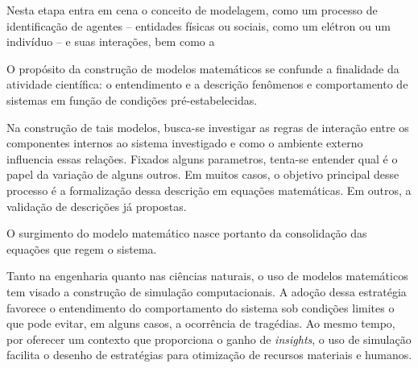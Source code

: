 Nesta etapa entra em cena o conceito de modelagem, como um processo de identificação de agentes -- entidades físicas ou sociais, como um elétron ou um indivíduo  -- e suas interações, bem como a  









	

O propósito da construção de modelos matemáticos se confunde a finalidade da atividade científica: o entendimento e a descrição fenômenos e comportamento de sistemas em função de condições pré-estabelecidas.
 
Na construção de tais modelos, busca-se investigar as regras de interação entre os componentes internos ao sistema investigado e como o ambiente externo influencia essas relações. Fixados alguns parametros, tenta-se entender qual é o papel da variação de alguns outros. Em muitos casos, o objetivo principal desse processo é a formalização dessa descrição em equações matemáticas. Em outros, a validação de descrições já propostas. 

O surgimento do modelo matemático nasce portanto da consolidação das equações que regem o sistema.

Tanto na engenharia quanto nas ciências naturais, o uso de modelos matemáticos tem visado a construção de simulação computacionais. A adoção dessa estratégia favorece o entendimento do comportamento do sistema sob condições limites o que pode evitar, em alguns casos, a ocorrência de tragédias. Ao mesmo tempo, por oferecer um contexto que proporciona o ganho de \textit{insights}, o uso de simulação facilita o desenho de estratégias para otimização de recursos materiais e humanos. 


